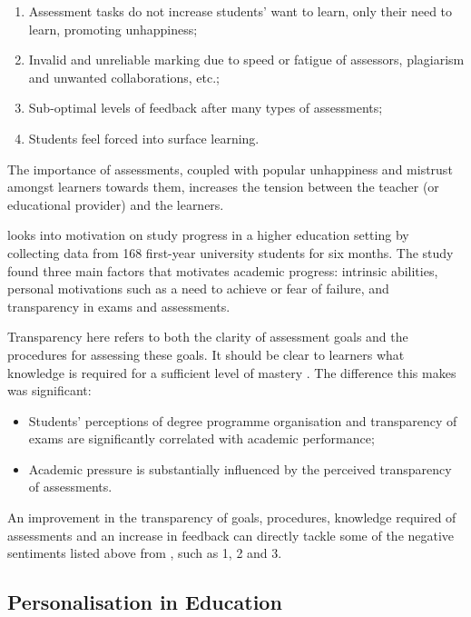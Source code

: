 \begin{enumerate}
    \setlength\itemsep{0em}
    \item Assessment tasks do not increase students' want to learn, only their need to learn, promoting unhappiness;
    \item Invalid and unreliable marking due to speed or fatigue of assessors, plagiarism and unwanted collaborations, etc.;
    \item Sub-optimal levels of feedback after many types of assessments;
    \item Students feel forced into surface learning.\\
    \citep[p.62-65]{brown1999assessment}
\end{enumerate}

The importance of assessments, coupled with popular unhappiness and mistrust amongst learners towards 
them, increases the tension between the teacher (or educational provider) and the learners.

\citet{suhre2013determinants} looks into motivation on study progress in a higher education setting by collecting data 
from 168 first-year university students for six months. The study found three main factors that motivates academic 
progress: intrinsic abilities, personal motivations such as a need to achieve or fear of failure, and transparency in 
exams and assessments.

Transparency here refers to both the clarity of assessment goals and the procedures for assessing these goals. 
It should be clear to learners what knowledge is required for a sufficient level of mastery \citep{suhre2013determinants}.
The difference this makes was significant:

\begin{itemize}
    \setlength\itemsep{0em}    
  \item Students' perceptions of degree programme organisation and transparency of exams are 
  significantly correlated with academic performance;
  \item Academic pressure is substantially influenced by the perceived transparency of assessments.
\end{itemize}

An improvement in the transparency of goals, procedures, knowledge required of assessments and an increase 
in feedback can directly tackle some of the negative sentiments listed above from \citet{brown1999assessment}, 
such as 1, 2 and 3.

\subsection{Personalisation in Education}

